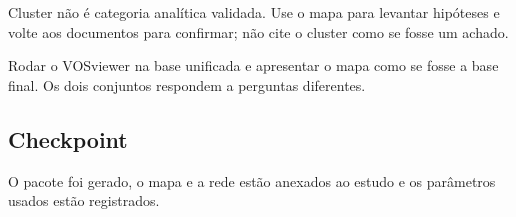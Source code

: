 \begin{nota}
Cluster não é categoria analítica validada. Use o mapa para levantar hipóteses e volte aos documentos
para confirmar; não cite o cluster como se fosse um achado.
\end{nota}

\begin{alerta}
Rodar o VOSviewer na base unificada e apresentar o mapa como se fosse a base final. Os dois conjuntos
respondem a perguntas diferentes.
\end{alerta}

\subsection*{Checkpoint}
\marcador\; O pacote foi gerado, o mapa e a rede estão anexados ao estudo e os parâmetros usados estão
registrados.
